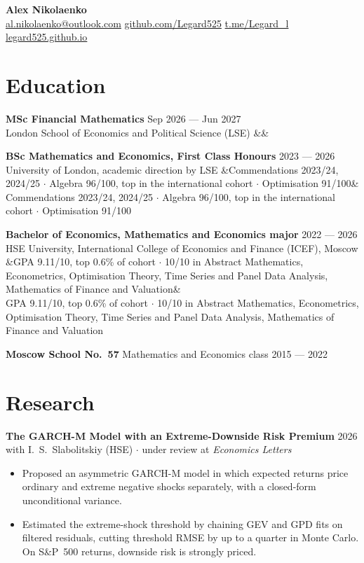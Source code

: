 \documentclass[11pt,a4paper]{article}
\newcommand{\edublock}[4]{%
  \textbf{#1} \hfill \textcolor{muted}{\small #3}\\%
  \textcolor{muted}{\small #2}%
  \ifx&#4&\else\\\textcolor{muted}{\small #4}\fi%
}
\begin{document}
\begin{center}
{\fontsize{22}{26}\selectfont\bfseries Alex Nikolaenko}\\[4pt]
\textcolor{muted}{\small
  \href{mailto:al.nikolaenko@outlook.com}{al.nikolaenko@outlook.com}
  \quad\textbar\quad
  \href{https://github.com/Legard525}{github.com/Legard525}
  \quad\textbar\quad
  \href{https://t.me/Legard_l}{t.me/Legard\_l}
  \quad\textbar\quad
  \href{https://legard525.github.io}{legard525.github.io}
}
\end{center}

\section{Education}

\edublock{MSc Financial Mathematics}{London School of Economics and Political Science (LSE)}{Sep 2026 --- Jun 2027}{}

\vspace{4pt}

\edublock{BSc Mathematics and Economics, First Class Honours}{University of London, academic direction by LSE}{2023 --- 2026}{Commendations 2023/24, 2024/25 $\cdot$ Algebra 96/100, top in the international cohort $\cdot$ Optimisation 91/100}

\vspace{4pt}

\edublock{Bachelor of Economics, Mathematics and Economics major}{HSE University, International College of Economics and Finance (ICEF), Moscow}{2022 --- 2026}{GPA 9.11/10, top 0.6\% of cohort $\cdot$ 10/10 in Abstract Mathematics, Econometrics, Optimisation Theory, Time Series and Panel Data Analysis, Mathematics of Finance and Valuation}

\vspace{4pt}

\textbf{Moscow School No.~57} \textcolor{muted}{\small Mathematics and Economics class} \hfill \textcolor{muted}{\small 2015 --- 2022}

\section{Research}

\textbf{The GARCH-M Model with an Extreme-Downside Risk Premium} \hfill \textcolor{muted}{\small 2026}\\
\textcolor{muted}{\small with I.~S.~Slabolitskiy (HSE) $\cdot$ under review at \textit{Economics Letters}}
\begin{itemize}
  \item Proposed an asymmetric GARCH-M model in which expected returns price ordinary and extreme negative shocks separately, with a closed-form unconditional variance.
  \item Estimated the extreme-shock threshold by chaining GEV and GPD fits on filtered residuals, cutting threshold RMSE by up to a quarter in Monte Carlo. On S\&P~500 returns, downside risk is strongly priced.
\end{itemize}
\end{document}
